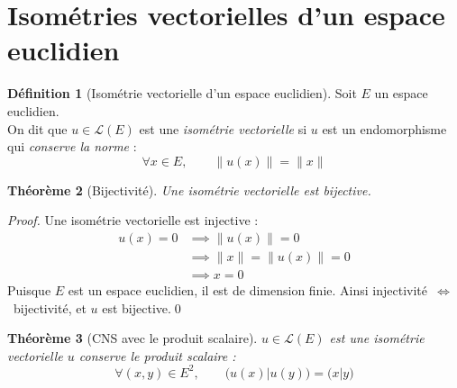 \documentclass[11pt,a4paper]{report}
\newtheorem{theorem}{Théorème}[chapter]
\theoremstyle{definition}
\newtheorem{dfn}[theorem]{Définition}
\begin{document}
\section{Isométries vectorielles d'un espace euclidien} %
\label{sec:isometries_vectorielles_d_un_espace_euclidien}
\begin{dfn}[Isométrie vectorielle d'un espace euclidien]
     Soit $E$ un espace euclidien.\\
     On dit que $u\in \mathcal{L}(E)$ est une \emph{isométrie vectorielle} si $u$ est un endomorphisme qui \emph{conserve la norme} :
     \begin{equation}
     \forall x\in E,\qquad \|u(x)\| = \| x\|
     \end{equation}
\end{dfn}
\begin{theorem}[Bijectivité]
     Une isométrie vectorielle est bijective.
\end{theorem}
\begin{proof}
     Une isométrie vectorielle est injective : 
     \begin{align*}
         u(x) = 0 &\implies \| u(x)\| = 0\\ 
                  &\implies \| x \| = \| u(x)\| = 0\\ 
                  &\implies x=0
     \end{align*}
     Puisque $E$ est un espace euclidien, il est de dimension finie. Ainsi injectivité~$\Leftrightarrow$~bijectivité, et $u$ est bijective.\qed
\end{proof}
\begin{theorem}[CNS avec le produit scalaire]
     $u\in \mathcal{L}(E)$ est une \emph{isométrie vectorielle} \Longleftrightarrow $u$ conserve le produit scalaire : 
     \begin{equation}
     \forall (x,y)\in E^2,\qquad \Big( u(x) \Big| u(y) \Big) = \big( x|y\big) 
     \end{equation}
\end{theorem}
\end{document}
